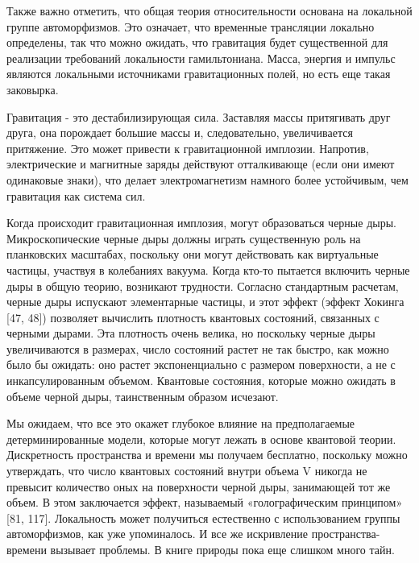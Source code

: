 \documentclass[main.tex]{subfiles}
\begin{document}
Также важно отметить, что общая теория относительности основана на локальной группе автоморфизмов. Это означает, что временные трансляции локально определены, так что можно ожидать, что гравитация будет существенной для реализации требований локальности гамильтониана. Масса, энергия и импульс являются локальными источниками гравитационных полей, но есть еще такая заковырка.

Гравитация - это дестабилизирующая сила. Заставляя массы притягивать друг друга, она порождает большие массы и, следовательно, увеличивается притяжение. Это может привести к гравитационной имплозии. Напротив, электрические и магнитные заряды действуют отталкивающе (если они имеют одинаковые знаки), что делает электромагнетизм намного более устойчивым, чем гравитация как система сил.

Когда происходит гравитационная имплозия, могут образоваться черные дыры. Микроскопические черные дыры должны играть существенную роль на планковских масштабах, поскольку они могут действовать как виртуальные частицы, участвуя в колебаниях вакуума. Когда кто-то пытается включить черные дыры в общую теорию, возникают трудности. Согласно стандартным расчетам, черные дыры испускают элементарные частицы, и этот эффект (эффект Хокинга [47, 48]) позволяет вычислить плотность квантовых состояний, связанных с черными дырами. Эта плотность очень велика, но поскольку черные дыры увеличиваются в размерах, число состояний растет не так быстро, как можно было бы ожидать: оно растет экспоненциально с размером поверхности, а не с инкапсулированным объемом. Квантовые состояния, которые можно ожидать в объеме черной дыры, таинственным образом исчезают.

Мы ожидаем, что все это окажет глубокое влияние на предполагаемые детерминированные модели, которые могут лежать в основе квантовой теории. Дискретность пространства и времени мы получаем бесплатно, поскольку можно  утверждать, что число квантовых состояний внутри объема V никогда не превысит количество оных на поверхности  черной дыры, занимающей тот же объем. В этом заключается эффект, называемый «голографическим принципом» [81, 117]. Локальность может получиться естественно с использованием группы автоморфизмов, как уже упоминалось. И все же искривление пространства-времени вызывает проблемы. В книге природы пока еще слишком много тайн.
\end{document}
